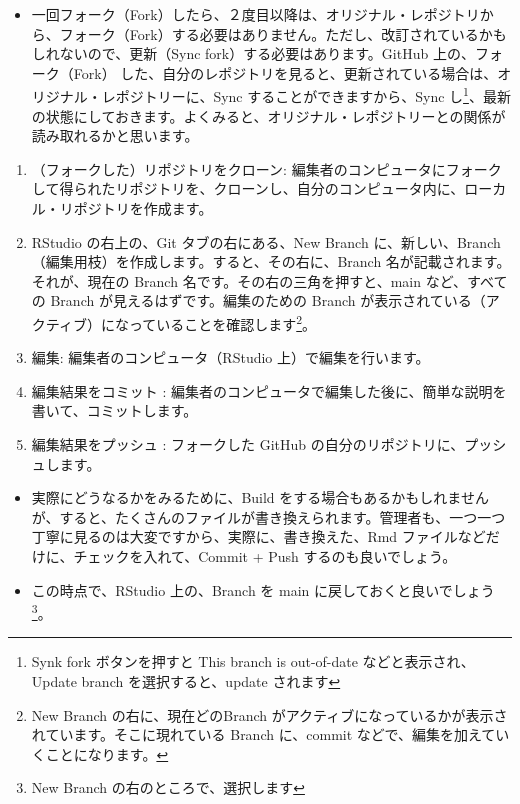 \documentclass[
  xelatex, ja=standard]{bxjsbook}
\providecommand{\tightlist}{%
  \setlength{\itemsep}{0pt}\setlength{\parskip}{0pt}}
\theoremstyle{definition}
\theoremstyle{definition}
\theoremstyle{definition}
\theoremstyle{definition}
\theoremstyle{remark}
\begin{document}
\begin{itemize}
\tightlist
\item
  一回フォーク（Fork）したら、２度目以降は、オリジナル・レポジトリから、フォーク（Fork）する必要はありません。ただし、改訂されているかもしれないので、更新（Sync fork）する必要はあります。GitHub 上の、フォーク（Fork） した、自分のレポジトリを見ると、更新されている場合は、オリジナル・レポジトリーに、Sync することができますから、Sync し\footnote{Synk fork ボタンを押すと This branch is out-of-date などと表示され、Update branch を選択すると、update されます}、最新の状態にしておきます。よくみると、オリジナル・レポジトリーとの関係が読み取れるかと思います。
\end{itemize}

\begin{enumerate}
\def\labelenumi{\arabic{enumi}.}
\setcounter{enumi}{2}
\item
  （フォークした）リポジトリをクローン: 編集者のコンピュータにフォークして得られたリポジトリを、クローンし、自分のコンピュータ内に、ローカル・リポジトリを作成ます。
\item
  RStudio の右上の、Git タブの右にある、New Branch に、新しい、Branch（編集用枝）を作成します。すると、その右に、Branch 名が記載されます。それが、現在の Branch 名です。その右の三角を押すと、main など、すべての Branch が見えるはずです。編集のための Branch が表示されている（アクティブ）になっていることを確認します\footnote{New Branch の右に、現在どのBranch がアクティブになっているかが表示されています。そこに現れている Branch に、commit などで、編集を加えていくことになります。}。
\item
  編集: 編集者のコンピュータ（RStudio 上）で編集を行います。
\item
  編集結果をコミット : 編集者のコンピュータで編集した後に、簡単な説明を書いて、コミットします。
\item
  編集結果をプッシュ : フォークした GitHub の自分のリポジトリに、プッシュします。
\end{enumerate}

\begin{itemize}
\tightlist
\item
  実際にどうなるかをみるために、Build をする場合もあるかもしれませんが、すると、たくさんのファイルが書き換えられます。管理者も、一つ一つ丁寧に見るのは大変ですから、実際に、書き換えた、Rmd ファイルなどだけに、チェックを入れて、Commit + Push するのも良いでしょう。
\item
  この時点で、RStudio 上の、Branch を main に戻しておくと良いでしょう\footnote{New Branch の右のところで、選択します}。
\end{itemize}
\end{document}
